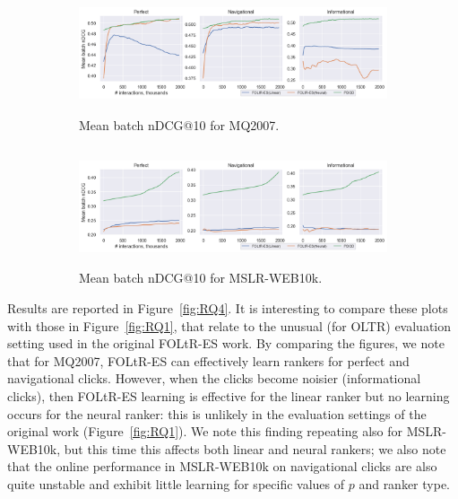\begin{figure}[t]
	\centering
	\begin{subfigure}{1\textwidth}
		\includegraphics[width=13cm, height=3.5cm]{images/RQ4/mq2007_foltr_PDGD_offline nDCG_c2000_p1.0.png}
		\caption{Mean batch nDCG@10 for MQ2007.}
		\label{fig:mq2007-rq4-offline}
	\end{subfigure}
	\begin{subfigure}{1\textwidth}
		\includegraphics[width=13cm, height=3.5cm]{images/RQ4/mslr10k_foltr_PDGD_offline nDCG_c2000_p1.0.png}
		\caption{Mean batch nDCG@10 for MSLR-WEB10k.}
		\label{fig:mslr10k-rq4-offline}
	\end{subfigure}
	\caption{{\color{red}{Results for RQ4: performance of FOLtR-ES and PDGD in terms of offline nDCG@10 with privatization parameter $p=1$ and 2,000 clients (averaged across all dataset splits).}} \label{fig:RQ4-offline}} 
\end{figure}

Results are reported in Figure~\ref{fig:RQ4}. It is interesting to compare these plots with those in Figure~\ref{fig:RQ1}, that relate to the unusual (for OLTR) evaluation setting used in the original FOLtR-ES work. By comparing the figures, we note that for MQ2007, FOLtR-ES can effectively learn rankers for perfect and navigational clicks. However, when the clicks become noisier (informational clicks), then FOLtR-ES learning is effective for the linear ranker but no learning occurs for the neural ranker: this is unlikely in the evaluation settings of the original work (Figure~\ref{fig:RQ1}). We note this finding repeating also for MSLR-WEB10k, but this time this affects both linear and neural rankers; we also note that the online performance in MSLR-WEB10k on navigational clicks are also quite unstable and exhibit little learning for specific values of $p$ and ranker type. {\color{red}{The online performance in MSLR10k on informational clicks (the noisiest clicks) even shows a decreasing trend as the update grows.}}


